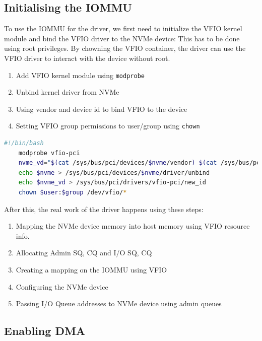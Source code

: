 \subsection{Initialising the IOMMU}

To use the IOMMU for the driver, we first need to initialize the VFIO kernel module and bind the VFIO driver to the NVMe device:
This has to be done using root privileges. By chowning the VFIO container, the driver can use the VFIO driver to interact with the device without root.

\begin{enumerate}
    \item Add VFIO kernel module using \texttt{modprobe}
    \item Unbind kernel driver from NVMe
    \item Using vendor and device id to bind VFIO to the device
    \item Setting VFIO group permissions to user/group using \texttt{chown}
\end{enumerate}

\begin{lstlisting}[language=bash,caption={Initializing VFIO using bash}]
    #!/bin/bash
    modprobe vfio-pci
    nvme_vd="$(cat /sys/bus/pci/devices/$nvme/vendor) $(cat /sys/bus/pci/devices/$nvme/device)"
    echo $nvme > /sys/bus/pci/devices/$nvme/driver/unbind
    echo $nvme_vd > /sys/bus/pci/drivers/vfio-pci/new_id
    chown $user:$group /dev/vfio/*     
\end{lstlisting}

After this, the real work of the driver happens using these steps:

\begin{enumerate}
    \item Mapping the NVMe device memory into host memory using VFIO resource info.
    \item Allocating Admin SQ, CQ and I/O SQ, CQ
    \item Creating a mapping on the IOMMU using VFIO
    \item Configuring the NVMe device
    \item Passing I/O Queue addresses to NVMe device using admin queues
\end{enumerate}

\subsection{Enabling DMA}

